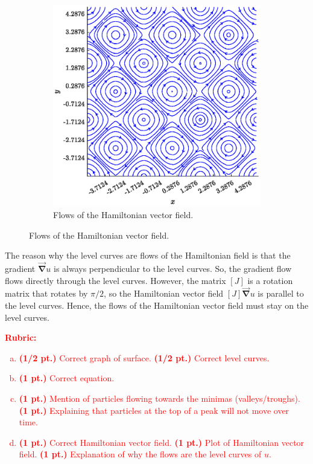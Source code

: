 \documentclass[12pt]{article} %
\newcommand{\grad}{\boldsymbol{\vec{\nabla}}}
\begin{document}
\begin{solution}
\begin{enumerate}[(a)]
\begin{figure}[H]
\begin{subfigure}[b]{0.45\textwidth}
        	\includegraphics[width=\textwidth]{figures/hamiltonian_flow}
            \caption{Flows of the Hamiltonian vector field.}
        \end{subfigure}
\end{figure}
The reason why the level curves are flows of the Hamiltonian field is that the gradient $\grad u$ is always perpendicular to the level curves. So, the gradient flow flows directly through the level curves. However, the matrix $[J]$ is a rotation matrix that rotates by $\pi/2$, so the Hamiltonian vector field $[J]\grad u$ is parallel to the level curves. Hence, the flows of the Hamiltonian vector field must stay on the level curves.
\end{enumerate}
\end{solution}
\vspace*{1cm}
\textcolor{red}{
\noindent \textbf{Rubric:}
\begin{enumerate}[(a)]
    \item \textbf{(1/2 pt.)} Correct graph of surface. \textbf{(1/2 pt.)} Correct level curves.
    \item \textbf{(1 pt.)} Correct equation.
	\item \textbf{(1 pt.)} Mention of particles flowing towards the minimas (valleys/troughs). \textbf{(1 pt.)} Explaining that particles at the top of a peak will not move over time.
    \item \textbf{(1 pt.)} Correct Hamiltonian vector field. \textbf{(1 pt.)} Plot of Hamiltonian vector field. \textbf{(1 pt.)} Explanation of why the flows are the level curves of $u$.
\end{enumerate}
}
\end{document}
